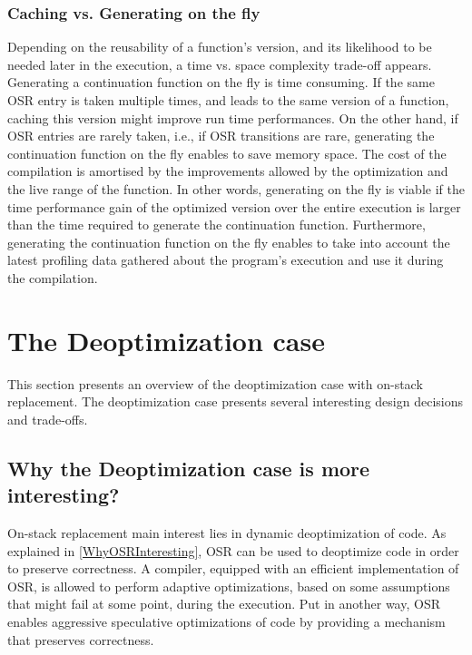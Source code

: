\subsubsection{Caching vs. Generating on the fly}

Depending on the reusability of a function's version, and its likelihood to be needed later in the execution, a time vs. space complexity trade-off appears.
Generating a continuation function on the fly is time consuming.
If the same OSR entry is taken multiple times, and leads to the same version of a function, caching this version might improve run time performances.
On the other hand, if OSR entries are rarely taken, i.e., if OSR transitions are rare, generating the continuation function on the fly enables to save memory space. 
The cost of the compilation is amortised by the improvements allowed by the optimization and the live range of the function. 
In other words, generating on the fly is viable if the time performance gain of the optimized version over the entire execution is larger than the time required to generate the continuation function.
Furthermore, generating the continuation function on the fly enables to take into account the latest profiling data gathered about the program's execution and use it during the compilation.\\


\section{The Deoptimization case}
This section presents an overview of the deoptimization case with on-stack replacement.
The deoptimization case presents several interesting design decisions and trade-offs.

\subsection{Why the Deoptimization case is more interesting?}
On-stack replacement main interest lies in dynamic deoptimization of code.
As explained in \ref{WhyOSRInteresting}, OSR can be used to deoptimize code in order to preserve correctness.
A compiler, equipped with an efficient implementation of OSR, is allowed to perform adaptive optimizations, based on some assumptions that might fail at some point, during the execution.
Put in another way, OSR enables aggressive speculative optimizations of code by providing a mechanism that preserves correctness.\\


